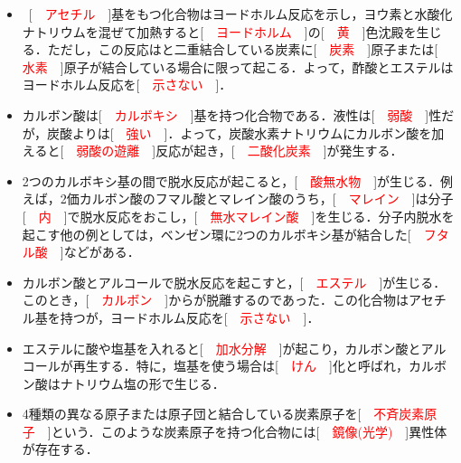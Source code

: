 \documentclass[a4paper,11pt]{ltjsarticle}
\begin{document}
\newpage
\begin{itemize}
      \item ~[　\textcolor{red}{アセチル}　]基をもつ化合物はヨードホルム反応を示し，ヨウ素と水酸化ナトリウムを混ぜて加熱すると[　\textcolor{red}{ヨードホルム}　]の[　\textcolor{red}{黄}　]色沈殿を生じる．ただし，この反応はと二重結合している炭素に[　\textcolor{red}{炭素}　]原子または[　\textcolor{red}{水素}　]原子が結合している場合に限って起こる．よって，酢酸とエステルはヨードホルム反応を[　\textcolor{red}{示さない}　]．\\
    \item カルボン酸は[　\textcolor{red}{カルボキシ}　]基を持つ化合物である．液性は[　\textcolor{red}{弱酸}　]性だが，炭酸よりは[　\textcolor{red}{強い}　]．よって，炭酸水素ナトリウムにカルボン酸を加えると[　\textcolor{red}{弱酸の遊離}　]反応が起き，[　\textcolor{red}{二酸化炭素}　]が発生する．\\
    \item 2つのカルボキシ基の間で脱水反応が起こると，[　\textcolor{red}{酸無水物}　]が生じる．例えば，2価カルボン酸のフマル酸とマレイン酸のうち，[　\textcolor{red}{マレイン}　]は分子[　\textcolor{red}{内}　]で脱水反応をおこし，[　\textcolor{red}{無水マレイン酸}　]を生じる．分子内脱水を起こす他の例としては，ベンゼン環に2つのカルボキシ基が結合した[　\textcolor{red}{フタル酸}　]などがある．\\
    \item カルボン酸とアルコールで脱水反応を起こすと，[　\textcolor{red}{エステル}　]が生じる．このとき，[　\textcolor{red}{カルボン}　]からが脱離するのであった．この化合物はアセチル基を持つが，ヨードホルム反応を[　\textcolor{red}{示さない}　]．\\
    \item エステルに酸や塩基を入れると[　\textcolor{red}{加水分解}　]が起こり，カルボン酸とアルコールが再生する．特に，塩基を使う場合は[　\textcolor{red}{けん}　]化と呼ばれ，カルボン酸はナトリウム塩の形で生じる．\\
    \item 4種類の異なる原子または原子団と結合している炭素原子を[　\textcolor{red}{不斉炭素原子}　]という．このような炭素原子を持つ化合物には[　\textcolor{red}{鏡像(光学)}　]異性体が存在する．
\end{itemize}
\end{document}
